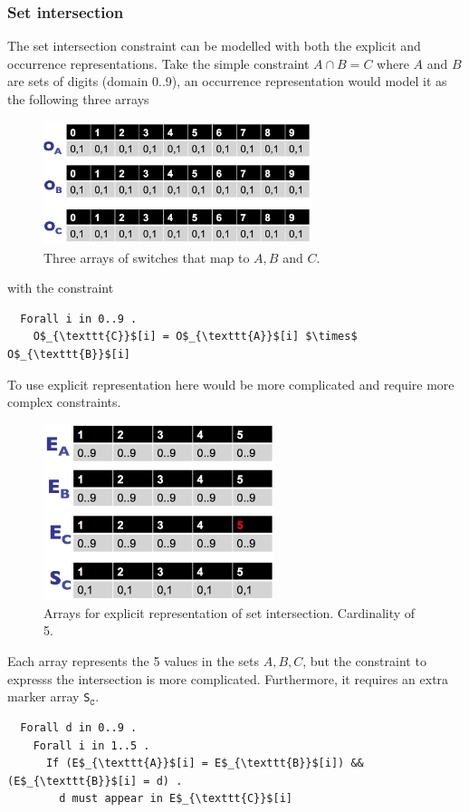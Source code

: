 \documentclass[CS4402-Notes.tex]{subfiles}
\begin{document}
\subsubsection{Set intersection}
The set intersection constraint can be modelled with both the explicit and occurrence representations. Take the simple constraint $A \cap B = C$ where $A$ and $B$ are sets of digits (domain 0..9), an occurrence representation would model it as the following three arrays
\begin{figure}[H]
\centering
\includegraphics[width=0.7\textwidth, keepaspectratio]{imgs/intersection-occurrence.png}
\caption{Three arrays of switches that map to $A, B$ and $C$.}
\end{figure}
\noindent
with the constraint
\begin{lstlisting}
  Forall i in 0..9 .
    O$_{\texttt{C}}$[i] = O$_{\texttt{A}}$[i] $\times$ O$_{\texttt{B}}$[i] 
\end{lstlisting}
To use explicit representation here would be more complicated and require more complex constraints.
\begin{figure}[H]
\centering
\includegraphics[width=0.6\textwidth, keepaspectratio]{imgs/intersect-explicit.png}
\caption{Arrays for explicit representation of set intersection. Cardinality of 5.}
\end{figure}
\noindent
Each array represents the 5 values in the sets $A, B, C$, but the constraint to expresss the intersection is more complicated. Furthermore, it requires an extra marker array \texttt{S$_{\texttt{C}}$}.
\begin{lstlisting}
  Forall d in 0..9 .
    Forall i in 1..5 .
      If (E$_{\texttt{A}}$[i] = E$_{\texttt{B}}$[i]) && (E$_{\texttt{B}}$[i] = d) . 
        d must appear in E$_{\texttt{C}}$[i]
\end{lstlisting}
\end{document}

